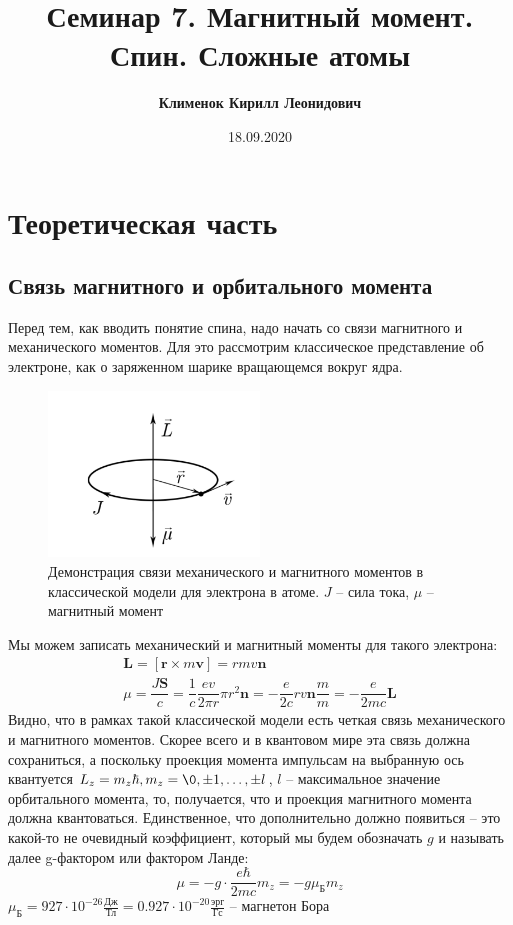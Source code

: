 \documentclass[12pt]{article}
\begin{document}
 
\title{\textbf{Семинар 7. Магнитный момент. Спин. Сложные атомы}}
\author{\textbf{Клименок Кирилл Леонидович}}
\date{18.09.2020}
\maketitle
\section{Теоретическая часть}

\subsection{Связь магнитного и орбитального момента}
Перед тем, как вводить понятие спина, надо начать со связи магнитного и механического моментов. Для это рассмотрим классическое представление об электроне, как о заряженном шарике вращающемся вокруг ядра. 
\begin{figure}[h]
    \centering
    \includegraphics[width=0.5\textwidth,height=\textheight,keepaspectratio]{Seminar_07/pics/pic_01.PNG}
    \caption{Демонстрация связи механического и магнитного моментов в классической модели для электрона в атоме. $J$ -- сила тока, $\mu$ -- магнитный момент}
    \label{fig:sem_7_gymagnetic_ratio}
\end{figure}
Мы можем записать механический и магнитный моменты для такого электрона:
\begin{gather*}
    \textbf{L} = [\textbf{r} \times m\textbf{v}] = rmv \textbf{n}\\
    \mu = \dfrac{J\textbf{S}}{c} = \dfrac{1}{c} \dfrac{ev}{2\pi r}\pi r^2 \textbf{n} = - \dfrac{e}{2c} rv\textbf{n} \dfrac{m}{m} = -\dfrac{e}{2mc}\textbf{L}
\end{gather*}
Видно, что в рамках такой классической модели есть четкая связь механического и магнитного моментов. Скорее всего и в квантовом мире эта связь должна сохраниться, а поскольку проекция момента импульсам на выбранную ось квантуется $L_z = m_z \hbar, m_z = \0, \pm 1, \dots, \pm l$, $l$ -- максимальное значение орбитального момента, то, получается, что и проекция магнитного момента должна квантоваться. Единственное, что дополнительно должно появиться -- это какой-то не очевидный коэффициент, который мы будем обозначать $g$ и называть далее g-фактором или фактором Ланде:
\begin{equation}
\mu = -g\cdot \dfrac{e\hbar}{2mc} m_z = -g \mu_{\text{Б}} m_z   
\end{equation}
$\mu_{\text{Б}} = 927 \cdot 10^{-26} \frac{\text{Дж}}{\text{Тл}} = 0.927 \cdot 10^{-20} \frac{\text{эрг}}{\text{Гс}}$ -- магнетон Бора
\end{document}
